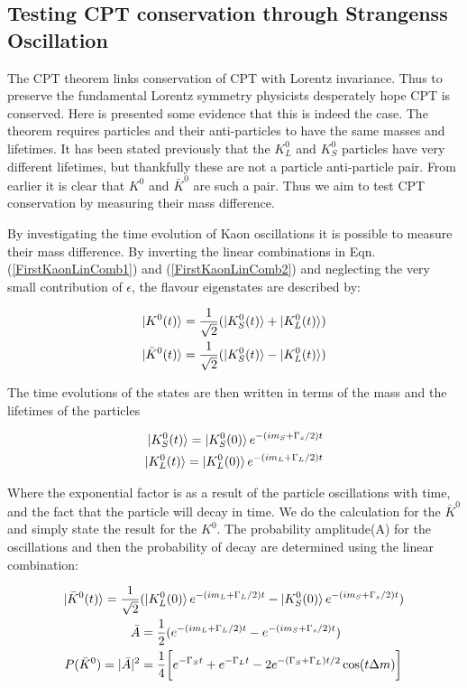 \subsection{Testing CPT conservation through Strangenss Oscillation}

The CPT theorem links conservation of CPT with Lorentz invariance. Thus to preserve the fundamental Lorentz symmetry physicists desperately hope CPT is conserved. Here is presented some evidence that this is indeed the case. The theorem requires particles and their anti-particles to have the same masses and lifetimes. It has been stated previously that the $K^{0}_{L}$ and $K^{0}_{S}$ particles have very different lifetimes, but thankfully these are not a particle anti-particle pair. From earlier it is clear that $K^{0}$ and $\bar{K}^{0}$ are such a pair. Thus we aim to test CPT conservation by measuring their mass difference.    

By investigating the time evolution of Kaon oscillations it is possible to measure their mass difference. By inverting the linear combinations in Eqn.(\ref{FirstKaonLinComb1}) and (\ref{FirstKaonLinComb2}) and neglecting the very small contribution of $\epsilon$, the flavour eigenstates are described by:

\begin{align*}
\ket{K^{0}(t)} = \frac{1}{\sqrt{2}} (\ket{K^{0}_{S}(t)} + \ket{K^{0}_{L}(t)}) \\
\ket{\bar{K}^{0}(t)}= \frac{1}{\sqrt{2}} (\ket{K^{0}_{S}(t)} - \ket{K^{0}_{L}(t)})
\end{align*} 

\noindent The time evolutions of the states are then written in terms of the mass and the lifetimes of the particles

\begin{align*}
\ket{K^{0}_{S}(t)} = \ket{K^{0}_{S}(0)} e^{-(im_{S}+\Gamma_{s}/2)t} \\
\ket{K^{0}_{L}(t)} = \ket{K^{0}_{L}(0)} e^{-(im_{L}+\Gamma_{L}/2)t} 
\end{align*} 

\noindent Where the exponential factor is as a result of the particle oscillations with time, and the fact that the particle will decay in time. We do the calculation for the $\bar{K}^{0}$ and simply state the result for the $K^{0}$. The probability amplitude(A) for the oscillations and then the probability of decay are determined using the linear combination:

\begin{align}
\ket{\bar{K}^{0}(t)} = \frac{1}{\sqrt{2}} & (\ket{K^{0}_{L}(0)} e^{-(im_{L}+\Gamma_{L}/2)t} - \ket{K^{0}_{S}(0)} e^{-(im_{S}+\Gamma_{s}/2)t}) \\
\bar{A} & = \frac{1}{2} (e^{-(im_{L}+\Gamma_{L}/2)t} - e^{-(im_{S}+\Gamma_{s}/2)t}) \\
\label{StrangenessOscillations1}
P(\bar{K}^{0}) = |\bar{A}|^{2} & = \frac{1}{4} \bigg[ e^{-\Gamma_{S}t} + e^{-\Gamma_{L}t} -2 e^{-(\Gamma_{S} + \Gamma_{L})t/2} \cos(t \Delta m )\bigg] \\
\end{align}

